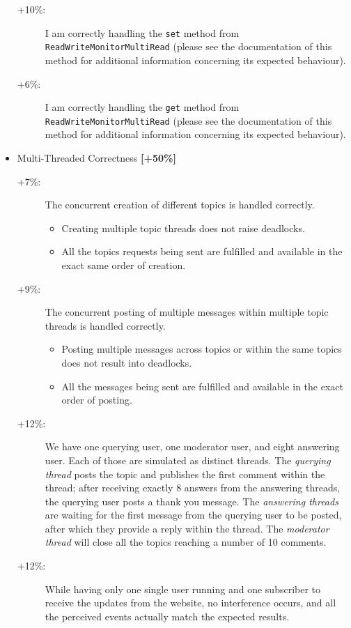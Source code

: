\documentclass{article}
\begin{document}
\begin{itemize}
\begin{description}
\item[+10\%: ] I am correctly handling the \texttt{set} method from \texttt{ReadWriteMonitorMultiRead} (please see the documentation of this method for additional information concerning its expected behaviour).
\item[+6\%: ] I am correctly handling the \texttt{get} method from \texttt{ReadWriteMonitorMultiRead} (please see the documentation of this method for additional information concerning its expected behaviour).




		\end{description}


	\item  Multi-Threaded Correctness \textbf{[+50\%]}
\begin{description}
	\item [+7\%:] The concurrent creation of different topics is handled correctly.
\begin{itemize}
\item Creating multiple topic threads does not raise deadlocks.
\item All the topics requests being sent are fulfilled and available in the exact same order of creation.
\end{itemize}
	\item [+9\%:] The concurrent posting of multiple messages within multiple topic threads is handled correctly.
\begin{itemize}
\item Posting multiple messages across topics or within the same topics does not result into deadlocks.
\item All the messages being sent are fulfilled and available in the exact order of posting.
\end{itemize}
\item [+12\%:] We have one querying user, one moderator user, and eight answering user. Each of those are simulated as distinct threads. The \textit{querying thread} posts the topic and publishes the first comment within the thread; after receiving exactly 8 answers from the answering threads, the querying user posts a thank you message. The \textit{answering threads} are waiting for the first message from the querying user to be posted, after which they provide a reply within the thread. The \textit{moderator thread}  will close all the topics reaching a number of 10 comments.   

\item [+12\%:] While having only one single user running and one subscriber to receive the updates from the website, no interference occurs, and all the perceived events actually match the expected results.
\end{description}



\end{itemize}
\end{document}
